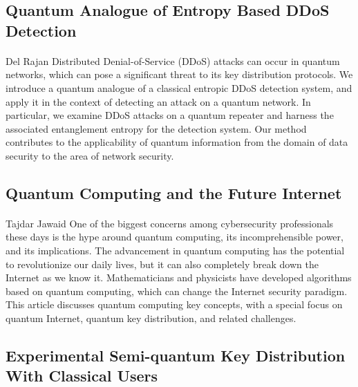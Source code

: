 \documentclass{article}%
\begin{document}
%
\subsection{Quantum Analogue of Entropy Based DDoS Detection}%
\label{subsec:QuantumAnalogueofEntropyBasedDDoSDetection}%
\paragraph{}%
Del Rajan%
Distributed Denial-of-Service (DDoS) attacks can occur in quantum networks, which can pose a significant threat to its key distribution protocols. We introduce a quantum analogue of a classical entropic DDoS detection system, and apply it in the context of detecting an attack on a quantum network. In particular, we examine DDoS attacks on a quantum repeater and harness the associated entanglement entropy for the detection system. Our method contributes to the applicability of quantum information from the domain of data security to the area of network security.

%
\subsection{Quantum Computing and the Future Internet}%
\label{subsec:QuantumComputingandtheFutureInternet}%
\paragraph{}%
Tajdar Jawaid%
One of the biggest concerns among cybersecurity professionals these days is the hype around quantum computing, its incomprehensible power, and its implications. The advancement in quantum computing has the potential to revolutionize our daily lives, but it can also completely break down the Internet as we know it. Mathematicians and physicists have developed algorithms based on quantum computing, which can change the Internet security paradigm. This article discusses quantum computing key concepts, with a special focus on quantum Internet, quantum key distribution, and related challenges.

%
\subsection{Experimental Semi-quantum Key Distribution With Classical Users}%
\label{subsec:ExperimentalSemi{-}quantumKeyDistributionWithClassicalUsers}%
\end{document}

